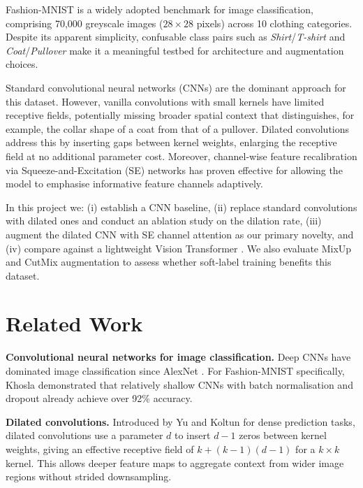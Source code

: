 \documentclass[10pt,a4paper]{article}
\begin{document}
Fashion-MNIST \cite{fashionmnist} is a widely adopted benchmark for image classification, comprising 70{,}000 greyscale images ($28\!\times\!28$ pixels) across 10 clothing categories.
Despite its apparent simplicity, confusable class pairs such as \textit{Shirt}/\textit{T-shirt} and \textit{Coat}/\textit{Pullover} make it a meaningful testbed for architecture and augmentation choices.

Standard convolutional neural networks (CNNs) are the dominant approach for this dataset.
However, vanilla convolutions with small kernels have limited receptive fields, potentially missing broader spatial context that distinguishes, for example, the collar shape of a coat from that of a pullover.
Dilated convolutions \cite{dilated} address this by inserting gaps between kernel weights, enlarging the receptive field at no additional parameter cost.
Moreover, channel-wise feature recalibration via Squeeze-and-Excitation (SE) networks \cite{senet} has proven effective for allowing the model to emphasise informative feature channels adaptively.

In this project we: (i) establish a CNN baseline, (ii) replace standard convolutions with dilated ones and conduct an ablation study on the dilation rate, (iii) augment the dilated CNN with SE channel attention as our primary novelty, and (iv) compare against a lightweight Vision Transformer \cite{vit}.
We also evaluate MixUp \cite{mixup} and CutMix \cite{cutmix} augmentation to assess whether soft-label training benefits this dataset.

\section{Related Work}

\textbf{Convolutional neural networks for image classification.}
Deep CNNs have dominated image classification since AlexNet \cite{alexnet}.
For Fashion-MNIST specifically, Khosla \cite{cnnfashion} demonstrated that relatively shallow CNNs with batch normalisation and dropout already achieve over 92\% accuracy.

\textbf{Dilated convolutions.}
Introduced by Yu and Koltun \cite{dilated} for dense prediction tasks, dilated convolutions use a parameter $d$ to insert $d{-}1$ zeros between kernel weights, giving an effective receptive field of $k + (k-1)(d-1)$ for a $k\!\times\!k$ kernel.
This allows deeper feature maps to aggregate context from wider image regions without strided downsampling.
\end{document}
